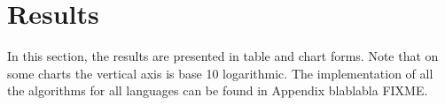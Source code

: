 \section{Results}
In this section, the results are presented in table and chart forms. Note that on some charts the vertical axis is base 10 logarithmic. The implementation of all the algorithms for all languages can be found in Appendix blablabla FIXME.











